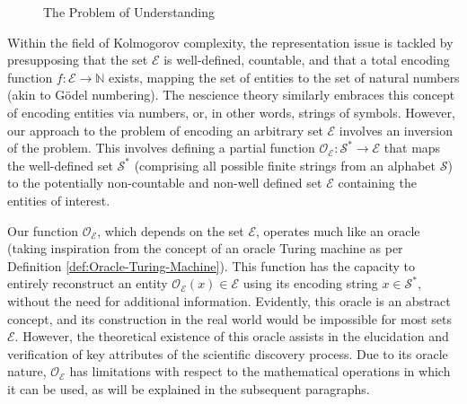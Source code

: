\begin{figure}[t]
\centering
{}
\caption{The Problem of Understanding}
\end{figure}

Within the field of Kolmogorov complexity, the representation issue is tackled by presupposing that the set $\mathcal{E}$ is well-defined, countable, and that a total encoding function $f:\mathcal{E} \rightarrow \mathbb{N}$ exists, mapping the set of entities to the set of natural numbers (akin to Gödel numbering). The nescience theory similarly embraces this concept of encoding entities via numbers, or, in other words, strings of symbols. However, our approach to the problem of encoding an arbitrary set $\mathcal{E}$ involves an inversion of the problem. This involves defining a partial function $\mathcal{O}_\mathcal{E}:\mathcal{S}^\ast \rightarrow \mathcal{E}$ that maps the well-defined set $\mathcal{S}^\ast$ (comprising all possible finite strings from an alphabet $\mathcal{S}$) to the potentially non-countable and non-well defined set $\mathcal{E}$ containing the entities of interest.

Our function $\mathcal{O}_\mathcal{E}$, which depends on the set $\mathcal{E}$, operates much like an oracle (taking inspiration from the concept of an oracle Turing machine as per Definition \ref{def:Oracle-Turing-Machine}). This function has the capacity to entirely reconstruct an entity $\mathcal{O}_\mathcal{E} (x) \in \mathcal{E}$ using its encoding string $x \in \mathcal{S}^\ast$, without the need for additional information. Evidently, this oracle is an abstract concept, and its construction in the real world would be impossible for most sets $\mathcal{E}$. However, the theoretical existence of this oracle assists in the elucidation and verification of key attributes of the scientific discovery process. Due to its oracle nature, $\mathcal{O}_\mathcal{E}$ has limitations with respect to the mathematical operations in which it can be used, as will be explained in the subsequent paragraphs.

